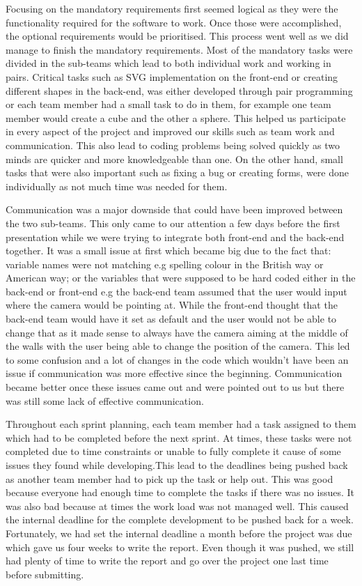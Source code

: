 \documentclass[a4paper]{report}
\begin{document}
	Focusing on the mandatory requirements first seemed logical as they were the functionality required for the software to work. Once those were accomplished, the optional requirements would be prioritised. This process went well as we did manage to finish the mandatory requirements. Most of the mandatory tasks were divided in the sub-teams which lead to both individual work and working in pairs. Critical tasks such as SVG implementation on the front-end or creating different shapes in the back-end, was either developed through pair programming or each team member had a small task to do in them, for example one team member would create a cube and the other a sphere. This helped us participate in every aspect of the project and improved our skills such as  team work and communication. This also lead to  coding problems being solved quickly as two minds are quicker and more knowledgeable than one. On the other hand, small tasks that were also important such as fixing a bug or creating forms, were done individually as not much time was needed for them. 
	
	Communication was a major downside that could have been improved between the two sub-teams. This only came to our attention a few days before the first presentation while we were trying to integrate both front-end and the back-end together. It was a small issue at first which became big due to the fact that: variable names were not matching e.g spelling colour in the British way or American way; or the variables that were supposed to be hard coded either in the back-end or front-end e.g the back-end team assumed that the user would input where the camera would be pointing at. While the front-end thought that the back-end team would have it set as default and the user would not be able to change that as it made sense to always have the camera aiming at the middle of the walls with the user being able to change the position of the camera. This led to some confusion and a lot of changes in the code which wouldn't have been an issue if communication was more effective since the beginning. Communication became better once these issues came out and were pointed out to us but there was still some lack of effective communication.
	
	
	Throughout each sprint planning, each team member had a task assigned to them which had to be completed before the next sprint. At times, these tasks were not completed due to time constraints or unable to fully complete it cause of some issues they found while developing.This lead to the deadlines being pushed back as another team member had to pick up the task or help out. This was good because everyone had enough time to complete the tasks if there was no issues. It was also bad because at times the work load was not managed well. This caused the internal deadline for the complete development to be pushed back for a week. Fortunately, we had set the internal deadline a month before the project was due which gave us four weeks to write the report. Even though it was pushed, we still had plenty of time to write the report and go over the project one last time before submitting.
	
\end{document}

